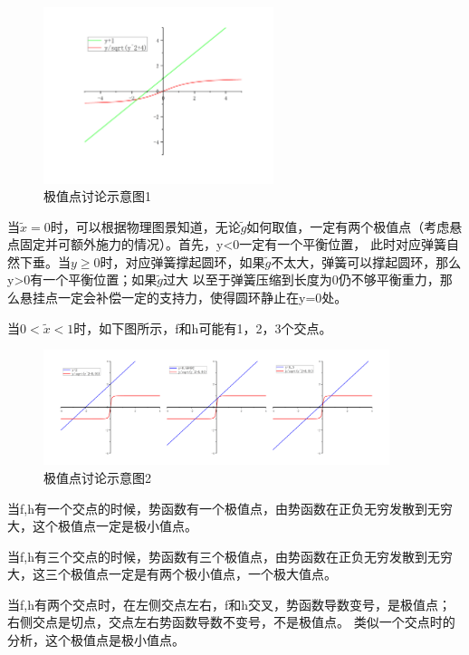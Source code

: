 \documentclass[10pt, a4paper]{article}
\newcommand{\wx}{\widetilde{x}}
\newcommand{\wg}{\widetilde{g}}
\begin{document}
    \begin{figure}[H]
        \centering
        \includegraphics[width=0.6\textwidth]{极值点讨论示意图1.jpg}
        \caption{极值点讨论示意图1}\label{极值点讨论示意图1}
    \end{figure}

    当$\wx=0$时，可以根据物理图景知道，无论$\wg$如何取值，一定有两个极值点（考虑悬点固定并可额外施力的情况）。首先，y<0一定有一个平衡位置，
    此时对应弹簧自然下垂。当$y\ge0$时，对应弹簧撑起圆环，如果$\wg$不太大，弹簧可以撑起圆环，那么y>0有一个平衡位置；如果$\wg$过大
    以至于弹簧压缩到长度为0仍不够平衡重力，那么悬挂点一定会补偿一定的支持力，使得圆环静止在y=0处。

    当$0<\wx<1$时，如下图所示，f和h可能有1，2，3个交点。

    \begin{figure}[H]
        \centering
        \includegraphics[width=0.9\textwidth]{极值点讨论示意图2.jpg}
        \caption{极值点讨论示意图2}\label{极值点讨论示意图2}
    \end{figure}

    当f,h有一个交点的时候，势函数有一个极值点，由势函数在正负无穷发散到无穷大，这个极值点一定是极小值点。

    当f,h有三个交点的时候，势函数有三个极值点，由势函数在正负无穷发散到无穷大，这三个极值点一定是有两个极小值点，一个极大值点。

    当f,h有两个交点时，在左侧交点左右，f和h交叉，势函数导数变号，是极值点；右侧交点是切点，交点左右势函数导数不变号，不是极值点。
    类似一个交点时的分析，这个极值点是极小值点。
\end{document}
